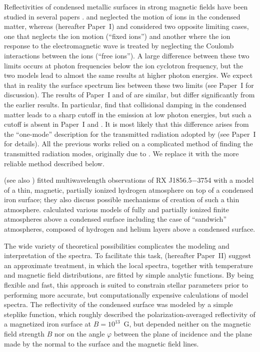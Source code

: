 \documentclass{aa}
\begin{document}
Reflectivities of condensed metallic surfaces in strong
magnetic fields have been studied in several papers 
\citep{Brinkmann80,TurollaZD04,vanAdelsberg-ea05,PerezAMP05}. 
\citet{Brinkmann80} and \citet{TurollaZD04} neglected  the
motion of ions in the condensed matter, whereas 
\citet{vanAdelsberg-ea05} (hereafter Paper~I)  and
\citet{PerezAMP05} considered two opposite limiting cases,
one that neglects the ion motion (``fixed ions'') and
another where the ion response to the electromagnetic wave
is treated by neglecting the Coulomb interactions between the
ions (``free ions''). A large difference between these two
limits occurs at photon frequencies below the ion cyclotron
frequency, but the two models lead to almost the same
results at higher photon energies. We expect that in reality
the surface spectrum lies between these two limits (see
Paper~I for discussion). The results of Paper~I  and of
\citet{PerezAMP05} are similar, but
differ significantly from the earlier results. In
particular, \citet{TurollaZD04} find that collisional
damping in the condensed matter leads to a sharp cutoff in
the emission at low photon energies, but such a cutoff is
absent in Paper~I and \citet{PerezAMP05}. It is most
likely that this difference arises from the ``one-mode''
description for the transmitted radiation adopted by 
\citet{TurollaZD04} (see Paper~I for details). All the
previous works relied on a complicated method of finding the
transmitted radiation modes, originally due to
\citet{Brinkmann80}. We replace it with the more reliable method
described below. 

\citet{Ho-ea07} (see also \citealp{Ho07})
fitted multiwavelength 
observations of RX J1856.5$-$3754 
with a model of a thin, magnetic, partially ionized hydrogen
atmosphere on top of a condensed iron surface; they also
discuss possible mechanisms of creation of such a thin
atmosphere. \citet{SuleimanovPW09} calculated
various models of fully and partially ionized
finite atmospheres above a condensed surface
including the case of ``sandwich'' atmospheres,
composed of hydrogen and helium layers above a condensed surface.

The wide variety of theoretical possibilities complicates the
modeling and interpretation of the spectra. To
facilitate this task, \citet{Suleimanov-ea10} 
           (hereafter Paper~II)
suggest an approximate treatment, in which the local
spectra, together with temperature and magnetic field
distributions, are fitted by simple analytic functions. By being
flexible and fast, this approach is suited to constrain stellar
parameters prior to performing more accurate, but computationally
expensive calculations of model spectra. The
reflectivity of the condensed surface was modeled by a simple
steplike function, which roughly described
the polarization-averaged reflectivity of a
magnetized iron surface at $B=10^{13}$~G,
but depended neither on the magnetic field
strength $B$ nor on the angle $\varphi$ between the plane of
incidence and the plane made by the normal to the surface and the
magnetic field lines.
\end{document}
